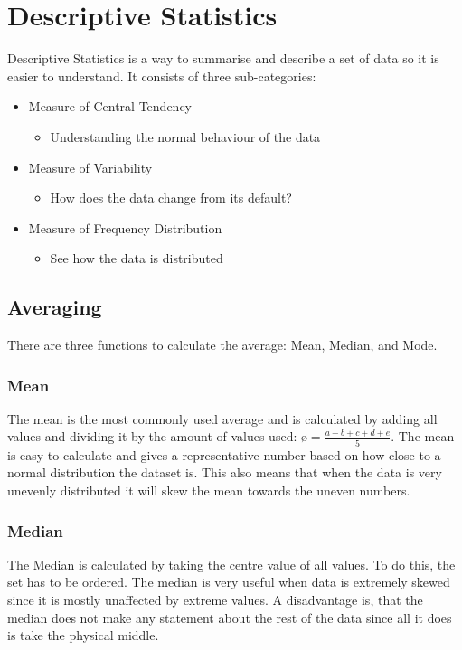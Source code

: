 \documentclass{article}
\begin{document}
	\section{Descriptive Statistics}
	Descriptive Statistics is a way to summarise and describe a set of data so it is easier to understand. It consists of three sub-categories:
	\begin{itemize}
		\item{Measure of Central Tendency}
		\begin{itemize}
			\item{Understanding the normal behaviour of the data}
		\end{itemize}
		\item{Measure of Variability}
		\begin{itemize}
			\item{How does the data change from its default?}
		\end{itemize}
		\item{Measure of Frequency Distribution}
		\begin{itemize}
			\item{See how the data is distributed}
		\end{itemize}
	\end{itemize}
	\subsection{Averaging}
	There are three functions to calculate the average: Mean, Median, and Mode.
	\subsubsection{Mean}
	The mean is the most commonly used average and is calculated by adding all values and dividing it by the amount of values used: $ø = \frac{a+b+c+d+e}{5}$.
	The mean is easy to calculate and gives a representative number based on how close to a normal distribution the dataset is. This also means that when the data is very unevenly distributed it will skew the mean towards the uneven numbers.
	\subsubsection{Median}
	The Median is calculated by taking the centre value of all values. To do this, the set has to be ordered. The median is very useful when data is extremely skewed since it is mostly unaffected by extreme values. A disadvantage is, that the median does not make any statement about the rest of the data since all it does is take the physical middle.
\end{document}
